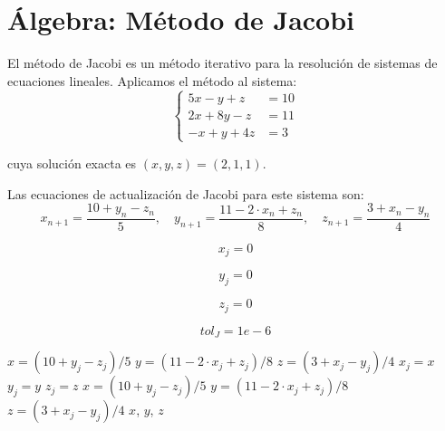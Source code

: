 \documentclass{article}
\begin{document}

\section{\'Algebra: M\'etodo de Jacobi}

El m\'etodo de Jacobi es un m\'etodo iterativo para la resoluci\'on de sistemas de
ecuaciones lineales. Aplicamos el m\'etodo al sistema:
\[
    \left \{
        \begin{array}{rr}
        5x-y+z & = 10 \\
        2x+8y-z & = 11 \\
        -x+y+4z & = 3
        \end{array}
    \right .
\]

cuya soluci\'on exacta es $(x, y, z) = (2,1,1)$.

Las ecuaciones de actualizaci\'on de Jacobi para este sistema son:
\begin{equation}
    x_{n+1} = \frac{10 + y_n - z_n}{5}, \quad y_{n+1} = \frac{11 - 2\cdot x_n + z_n}{8}, \quad z_{n+1} = \frac{3 + x_n - y_n}{4}
\end{equation}

\begin{equation}
    x_j = 0
    \label{eq:calc:xj}
\end{equation}

\begin{equation}
    y_j = 0
    \label{eq:calc:yj}
\end{equation}

\begin{equation}
    z_j = 0
    \label{eq:calc:zj}
\end{equation}

\begin{equation}
    tol_{J} = 1e-6
    \label{eq:calc:tolJ}
\end{equation}

\begin{algorithm}
\caption{M\'etodo de Jacobi para $5x-y+z = 10$, $2x+8y-z = 11$, $-x+y+4z = 3$}
\label{alg:calc:x,y,z}
\begin{algorithmic}
    \STATE $x = (10 + y_j - z_j)/5$
    \STATE $y = (11 - 2\cdot x_j + z_j)/8$
    \STATE $z = (3 + x_j - y_j)/4$
        \STATE $x_j = x$
        \STATE $y_j = y$
        \STATE $z_j = z$
        \STATE $x = (10 + y_j - z_j)/5$
        \STATE $y = (11 - 2\cdot x_j + z_j)/8$
        \STATE $z = (3 + x_j - y_j)/4$
    \ENDWHILE
    \RETURN $x$, $y$, $z$
\end{algorithmic}
\end{algorithm}
\end{document}
